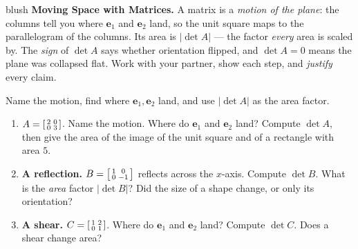 \documentclass[10pt]{article}
\newcommand{\ee}{\mathbf{e}}
\begin{document}
\namepartnerperiod

\vspace{0.10in}

\begin{headlinebox}{blush}
\small\textbf{Moving Space with Matrices.} A matrix is a \emph{motion of the plane}: the columns tell
you where $\ee_1$ and $\ee_2$ land, so the unit square maps to the parallelogram of the columns. Its
area is $|\det A|$ --- the factor \emph{every} area is scaled by. The \emph{sign} of $\det A$ says
whether orientation flipped, and $\det A=0$ means the plane was collapsed flat. Work with your partner,
show each step, and \emph{justify} every claim.
\end{headlinebox}

\vspace{0.10in}

\begin{tcolorbox}[colback=white, colframe=black!40, title=\textbf{Tier R --- Remediate},
    fonttitle=\bfseries, arc=1.5mm, left=3mm, right=3mm, top=2mm, bottom=2mm, breakable]
Name the motion, find where $\ee_1,\ee_2$ land, and use $|\det A|$ as the area factor.
\begin{enumerate}[leftmargin=1.7em, itemsep=9pt]
  \item $A=\begin{bsmallmatrix} 2 & 0 \\ 0 & 3 \end{bsmallmatrix}$. Name the motion. Where do $\ee_1$ and
        $\ee_2$ land? Compute $\det A$, then give the area of the image of the unit square and of a
        rectangle with area $5$. 
  \item \textbf{A reflection.} $B=\begin{bsmallmatrix} 1 & 0 \\ 0 & -1 \end{bsmallmatrix}$ reflects across
        the $x$-axis. Compute $\det B$. What is the \emph{area} factor $|\det B|$? Did the size of a shape
        change, or only its orientation? \; \blank{3.0cm}
  \item \textbf{A shear.} $C=\begin{bsmallmatrix} 1 & 2 \\ 0 & 1 \end{bsmallmatrix}$. Where do $\ee_1$ and
        $\ee_2$ land? Compute $\det C$. Does a shear change area? \; \blank{3.0cm}
\end{enumerate}
\end{tcolorbox}
\end{document}

